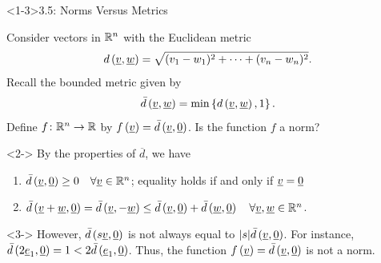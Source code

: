 \documentclass[10pt,english,aspectratio=169]{beamer}
\begin{document}
\begin{frame}
\end{frame}

\begin{frame}<1-3>{3.5: Norms Versus Metrics}

\begin{example}
Consider vectors in $\mathbb{R}^n$ with the Euclidean metric
\begin{equation*}
d \left( \underline{v}, \underline{w} \right)
= \sqrt{ (v_1 - w_1)^2 + \cdots + (v_n - w_n)^2 }.
\end{equation*}
Recall the bounded metric given by
\begin{equation*}
\bar{d} \left( \underline{v}, \underline{w} \right)
= \min \left\{ d \left( \underline{v}, \underline{w} \right), 1 \right\}.
\end{equation*}
\vspace{3mm}
Define $f \colon \mathbb{R}^n \rightarrow \mathbb{R}$ by
$f \left( \underline{v} \right) = \bar{d} \left( \underline{v}, \underline{0} \right)$.
Is the function $f$ a norm?

\begin{uncoverenv}<2->
By the properties of $\overline{d}$, we have
\begin{enumerate}
\item $\bar{d} \left( \underline{v}, \underline{0} \right) \geq 0 \quad \forall \underline{v} \in \mathbb{R}^n$; equality holds if and only if $\underline{v} = \underline{0}$ \addtocounter{enumi}{1}
\item $\bar{d} \left( \underline{v} + \underline{w}, \underline{0}\right) = \bar{d} \left( \underline{v}, -\underline{w} \right) \leq \bar{d} \left( \underline{v}, \underline{0} \right) + \bar{d} \left( \underline{w}, \underline{0} \right) \quad \forall \underline{v}, \underline{w} \in \mathbb{R}^n$.
\end{enumerate}
\end{uncoverenv}

\vspace{2mm}

\begin{uncoverenv}<3->
However, $\bar{d} \left( s \underline{v}, \underline{0} \right)$ is not always equal to $|s| \bar{d} \left( \underline{v}, \underline{0} \right)$.
For instance,
$\bar{d} \left( 2 \underline{e}_1, \underline{0} \right) = 1 < 2 \bar{d} \left( \underline{e}_1, \underline{0} \right)$.
Thus, the function $f \left( \underline{v} \right) = \bar{d} \left( \underline{v}, \underline{0} \right)$
is not a norm.
\end{uncoverenv}
\end{example}


\end{frame}
\end{document}
